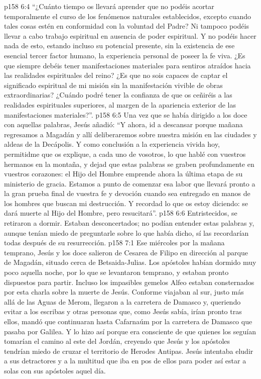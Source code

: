 \vs p158 6:4 “¿Cuánto tiempo os llevará aprender que no podéis acortar temporalmente el curso de los fenómenos naturales establecidos, excepto cuando tales cosas estén en conformidad con la voluntad del Padre? Ni tampoco podéis llevar a cabo trabajo espiritual en ausencia de poder espiritual. Y no podéis hacer nada de esto, estando incluso su potencial presente, sin la existencia de ese esencial tercer factor humano, la experiencia personal de poseer la fe viva. ¿Es que siempre debéis tener manifestaciones materiales para sentiros atraídos hacia las realidades espirituales del reino? ¿Es que no sois capaces de captar el significado espiritual de mi misión sin la manifestación vivible de obras extraordinarias? ¿Cuándo podré tener la confianza de que os ceñiréis a las realidades espirituales superiores, al margen de la apariencia exterior de las manifestaciones materiales?”.
\vs p158 6:5 Una vez que se había dirigido a los doce con aquellas palabras, Jesús añadió: “Y ahora, id a descansar porque mañana regresamos a Magadán y allí deliberaremos sobre nuestra misión en las ciudades y aldeas de la Decápolis. Y como conclusión a la experiencia vivida hoy, permitidme que os explique, a cada uno de vosotros, lo que hablé con vuestros hermanos en la montaña, y dejad que estas palabras se graben profundamente en vuestros corazones: el Hijo del Hombre emprende ahora la última etapa de su ministerio de gracia. Estamos a punto de comenzar esa labor que llevará pronto a la gran prueba final de vuestra fe y devoción cuando sea entregado en manos de los hombres que buscan mi destrucción. Y recordad lo que os estoy diciendo: se dará muerte al Hijo del Hombre, pero resucitará”.
\vs p158 6:6 Entristecidos, se retiraron a dormir. Estaban desconcertados; no podían entender estas palabras y, aunque tenían miedo de preguntarle sobre lo que había dicho, sí las recordarían todas después de su resurrección.
\vs p158 7:1 Ese miércoles por la mañana temprano, Jesús y los doce salieron de Cesarea de Filipo en dirección al parque de Magadán, situado cerca de Betsaida\hyp{}Julias. Los apóstoles habían dormido muy poco aquella noche, por lo que se levantaron temprano, y estaban pronto dispuestos para partir. Incluso los impasibles gemelos Alfeo estaban consternados por esta charla sobre la muerte de Jesús. Conforme viajaban al sur, justo más allá de las Aguas de Merom, llegaron a la carretera de Damasco y, queriendo evitar a los escribas y otras personas que, como Jesús sabía, irían pronto tras ellos, mandó que continuaran hasta Cafarnaúm por la carretera de Damasco que pasaba por Galilea. Y lo hizo así porque era consciente de que quienes los seguían tomarían el camino al este del Jordán, creyendo que Jesús y los apóstoles tendrían miedo de cruzar el territorio de Herodes Antipas. Jesús intentaba eludir a sus detractores y a la multitud que iba en pos de ellos para poder así estar a solas con sus apóstoles aquel día.
